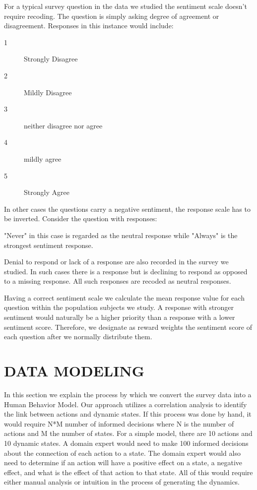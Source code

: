 {For a typical survey question in the data we studied the sentiment scale doesn't require recoding. The question is simply asking degree of agreement or disagreement. Responses in this instance would include:

\begin{description}
	\item [1] Strongly Disagree
	\item [2] Mildly Disagree
	\item [3] neither disagree nor agree
	\item [4] mildly agree
	\item [5] Strongly Agree
\end{description} 


In other cases the questions carry a negative sentiment, the response scale has to be inverted. Consider the question with responses:


"Never" in this case is regarded as the neutral response while "Always" is the strongest sentiment response.

Denial to respond or lack of a response are also recorded in the survey we studied. In such cases there is a response but is declining to respond as opposed to a missing response. All such responses are recoded as neutral responses. 

Having a correct sentiment scale we calculate the mean response value for each question within the population subjects we study. A response with stronger sentiment would naturally be a higher priority than a response with a lower sentiment score. Therefore, we designate as reward weights the sentiment score of each question after we normally distribute them. 


\section{DATA MODELING}

In this section we explain the process by which we convert the survey data into a Human Behavior Model. Our approach utilizes a correlation analysis to identify the link between actions and dynamic states. If this process was done by hand, it would require N*M number of informed decisions where N is the number of actions and M the number of states. For a simple model, there are 10 actions and 10 dynamic states. A domain expert would need to make 100 informed decisions about the connection of each action to a state. The domain expert would also need to determine if an action will have a positive effect on a state, a negative effect, and what is the effect of that action to that state. All of this would require either manual analysis or intuition in the process of generating the dynamics. 

}
